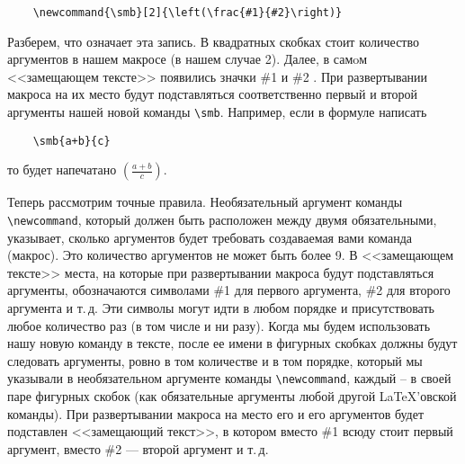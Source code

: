 \begin{verbatim}
	\newcommand{\smb}[2]{\left(\frac{#1}{#2}\right)}
\end{verbatim}

Разберем, что означает эта запись. В квадратных скобках стоит количество аргументов в нашем макросе (в нашем случае 2). Далее, в самoм <<замещающем тексте>> появились значки \#1 и \#2 . При развертывании макроса на их место будут подставляться соответственно первый и второй аргументы нашей новой команды \verb"\smb". Например, если в формуле написать

\begin{verbatim}
	\smb{a+b}{c}
\end{verbatim}
то будет напечатано $\left(\frac{a+b}{c}\right)$.

Теперь рассмотрим точные правила. Необязательный аргумент команды\\
\verb"\newcommand", который должен быть расположен между двумя обязательными, указывает, сколько аргументов будет требовать создаваемая вами команда (макрос). Это количество аргументов не может быть более 9. В <<замещающем тексте>> места, на которые при развертывании макроса будут подставляться аргументы, обозначаются символами \#1 для первого аргумента, \#2 для второго аргумента и т.\,д. Эти символы могут идти в любом порядке и присутствовать любое количество раз (в том числе и ни разу). Когда мы будем использовать нашу новую команду в тексте, после ее имени в фигурных скобках должны будут следовать аргументы, ровно в том количестве и в том порядке, который мы указывали в необязательном аргументе команды \verb"\newcommand", каждый -- в своей паре фигурных скобок (как обязательные аргументы любой другой \LaTeX’овской команды). При развертывании макроса на место его и его аргументов будет подставлен <<замещающий текст>>, в котором вместо \#1 всюду стоит первый аргумент, вместо \#2 — второй аргумент и т.\,д.